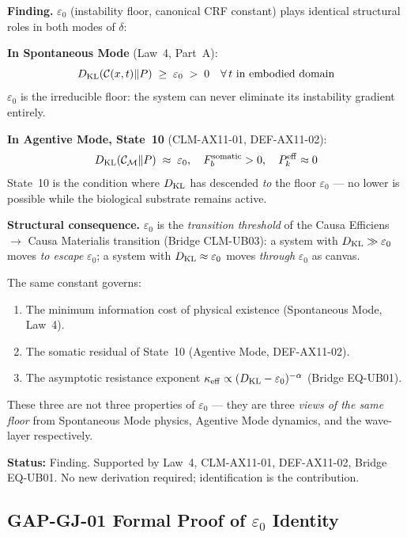 \documentclass[12pt, a4paper]{article}
\providecommand{\eps}{\varepsilon_0}
\providecommand{\Fbsom}{F_b^{\mathrm{somatic}}}
\begin{document}
\begin{derivedbox}[title={FIND-GJ-01: $\eps$ Universal Floor
  --- Same Object in Both Modes}]
\textbf{Finding.}
$\eps$ (instability floor, canonical CRF constant) plays
identical structural roles in both modes of $\delta$:

\medskip
\textbf{In Spontaneous Mode} (Law~4, Part~A):
\[
  D_{\rm KL}(\mathcal{C}(x,t)\|P) \;\geq\; \eps \;>\; 0
  \quad \forall\,t \text{ in embodied domain}
\]
$\eps$ is the irreducible floor: the system can never
eliminate its instability gradient entirely.

\medskip
\textbf{In Agentive Mode, State~10} (CLM-AX11-01,
DEF-AX11-02):
\[
  D_{\rm KL}(\mathcal{C}_\mathcal{M}\|P) \;\approx\; \eps,
  \quad \Fbsom > 0,\quad P_k^{\rm eff} \approx 0
\]
State~10 is the condition where $D_{\rm KL}$ has descended
\emph{to} the floor $\eps$ --- no lower is possible while
the biological substrate remains active.

\medskip
\textbf{Structural consequence.}
$\eps$ is the \emph{transition threshold} of the Causa
Efficiens $\to$ Causa Materialis transition (Bridge
CLM-UB03): a system with $D_{\rm KL} \gg \eps$ moves
\emph{to escape} $\eps$; a system with $D_{\rm KL} \approx
\eps$ moves \emph{through} $\eps$ as canvas.

The same constant governs:
\begin{enumerate}[leftmargin=*, noitemsep]
\item The minimum information cost of physical existence
  (Spontaneous Mode, Law~4).
\item The somatic residual of State~10 (Agentive Mode,
  DEF-AX11-02).
\item The asymptotic resistance exponent
  $\kappa_{\rm eff} \propto (D_{\rm KL} - \eps)^{-\alpha}$
  (Bridge EQ-UB01).
\end{enumerate}

These three are not three properties of $\eps$ ---
they are three \emph{views of the same floor}
from Spontaneous Mode physics, Agentive Mode dynamics,
and the wave-layer respectively.

\textbf{Status:} Finding. Supported by Law~4,
CLM-AX11-01, DEF-AX11-02, Bridge EQ-UB01.
No new derivation required; identification is the contribution.
\end{derivedbox}

\subsection{GAP-GJ-01 \quad Formal Proof of \texorpdfstring{$\eps$}{math} Identity}
\end{document}
